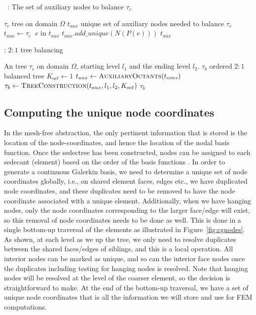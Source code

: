 \begin{algorithm}
   \caption{\taux~: The set of auxiliary nodes to balance $\tau_c$}\label{alg::bottom_up}
  \footnotesize
  \begin{algorithmic}[1]
    \Require $\tau_c$ tree on domain $\Omega$
    \Ensure  $t_{aux}$ unique set of auxiliary nodes needed to balance $\tau_c$
	\State $t_{aux} \leftarrow \tau_c$	
    \For  $~e$ in $t_{aux}$
      \State $t_{aux}.add\_unique(N(P(e)))$
    \EndFor
    \State \Return $t_{aux}$
  \end{algorithmic}
\end{algorithm}

\begin{algorithm}
  \caption{\tbal: $2:1$ tree balancing}\label{alg:tree_balance}
  \footnotesize
  \begin{algorithmic}[1]
    \Require An tree $\tau_c$ on domain $\Omega$, starting level $l_1$ and the ending level $l_2$.
    \Ensure $\tau_b$ ordered $2:1$ balanced tree
    \State $K_{oct}\leftarrow 1$
    \State $t_{aux} \leftarrow \textsc{AuxiliaryOctants}(t_{cons}) $
	\State $\tau_b \leftarrow \textsc{TreeConstruction} (t_{aux},l_1,l_2,K_{oct})$
	\State \Return $\tau_b$
  \end{algorithmic}
\end{algorithm}

\subsection{Computing the unique node coordinates}
\label{subsec:p_refinement}

In the mesh-free abstraction, the only pertinent information that is stored is the location of the node-coordinates, and hence the location of the nodal basis function. Once the sedectree has been constructed, nodes can be assigned to each sedecant (element) based on the order of the basis functions \cite{kopriva2009}. In order to generate a continuous Galerkin basis, we need to determine a unique set of node coordinates globally, i.e., on shared element faces, edges etc., we have duplicated node coordinates, and these duplicates need to be removed to have the node coordinate associated with a unique element. Additionally, when we have hanging nodes, only the node coordinates corresponding to the larger face/edge will exist, so this removal of node coordinates needs to be done as well. This is done in a single bottom-up traversal of the elements as illustrated in Figure~\ref{fig:cgnodes}. As shown, at each level as we up the tree, we only need to resolve duplicates between the shared faces/edges of siblings, and this is a local operation. All interior nodes can be marked as unique, and so can the interior face nodes once the duplicates including testing for hanging nodes is resolved. Note that hanging nodes will be resolved at the level of the coarser element, so the decision is straightforward to make. At the end of the bottom-up traversal, we have a set of unique node coordinates that is all the information we will store and use for FEM computations. 

